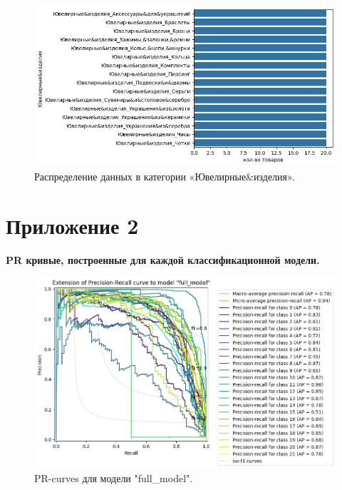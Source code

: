 \documentclass[a4paper,12pt]{extarticle}
\begin{document}
\begin{figure}[hbtp]
	\centering
	\includegraphics[scale=0.8]{приложения/amount_of_category_Ювелирные&изделия.png}
	\caption{Распределение данных в категории «Ювелирные\&изделия».}
	\label{fig:amount_of_category_Ювелирные&изделия}
\end{figure}

\newpage
\section{Приложение 2}
\label{appendix:pr_curves}
\textbf{\large{PR кривые, построенные для каждой классификационной модели.}}

\begin{figure}[hbtp]
	\centering
	\includegraphics[scale=0.7]{pr_curves/prcurve_full_model.png}
	\caption{PR-curves для модели "full\_model".}
	\label{fig:prcurve_full_model}
\end{figure}
\end{document}
